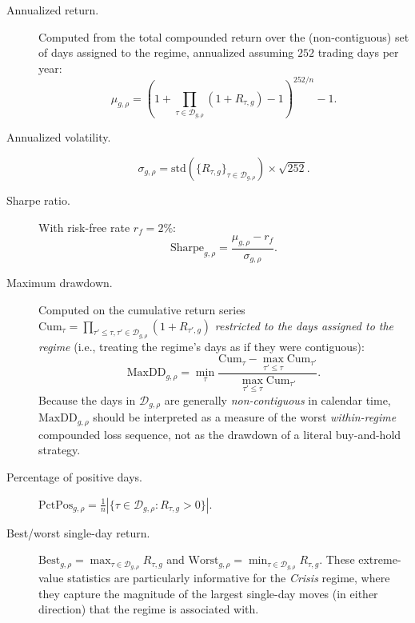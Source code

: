 \begin{description}
  \item[Annualized return.] Computed from the total compounded return over
  the (non-contiguous) set of days assigned to the regime, annualized
  assuming $252$ trading days per year:
  \begin{equation}
    \label{eq:ann-return}
    \mu_{g,\rho} = \left(1 + \prod_{\tau \in \mathcal{D}_{g,\rho}}
    (1 + R_{\tau,g}) - 1\right)^{252/n} - 1.
  \end{equation}

  \item[Annualized volatility.]
  \begin{equation}
    \label{eq:ann-vol}
    \sigma_{g,\rho} = \mathrm{std}\left(\{R_{\tau,g}\}_{\tau \in
    \mathcal{D}_{g,\rho}}\right) \times \sqrt{252}.
  \end{equation}

  \item[Sharpe ratio.] With risk-free rate $r_f = 2\%$:
  \begin{equation}
    \label{eq:sharpe}
    \mathrm{Sharpe}_{g,\rho} = \frac{\mu_{g,\rho} - r_f}{\sigma_{g,\rho}}.
  \end{equation}

  \item[Maximum drawdown.] Computed on the cumulative return series
  $\mathrm{Cum}_\tau = \prod_{\tau' \le \tau, \tau' \in
  \mathcal{D}_{g,\rho}} (1 + R_{\tau',g})$ \emph{restricted to the days
  assigned to the regime} (i.e., treating the regime's days as if they
  were contiguous):
  \begin{equation}
    \label{eq:max-dd}
    \mathrm{MaxDD}_{g,\rho} = \min_\tau \frac{\mathrm{Cum}_\tau -
    \max_{\tau' \le \tau} \mathrm{Cum}_{\tau'}}{\max_{\tau' \le \tau}
    \mathrm{Cum}_{\tau'}}.
  \end{equation}
  Because the days in $\mathcal{D}_{g,\rho}$ are generally
  \emph{non-contiguous} in calendar time, $\mathrm{MaxDD}_{g,\rho}$ should
  be interpreted as a measure of the worst \emph{within-regime} compounded
  loss sequence, not as the drawdown of a literal buy-and-hold strategy.

  \item[Percentage of positive days.]
  $\mathrm{PctPos}_{g,\rho} = \frac{1}{n}\left|\{\tau \in
  \mathcal{D}_{g,\rho} : R_{\tau,g} > 0\}\right|$.

  \item[Best/worst single-day return.]
  $\mathrm{Best}_{g,\rho} = \max_{\tau \in \mathcal{D}_{g,\rho}} R_{\tau,g}$
  and $\mathrm{Worst}_{g,\rho} = \min_{\tau \in \mathcal{D}_{g,\rho}}
  R_{\tau,g}$. These extreme-value statistics are particularly informative
  for the \emph{Crisis} regime, where they capture the magnitude of the
  largest single-day moves (in either direction) that the regime is
  associated with.
\end{description}

